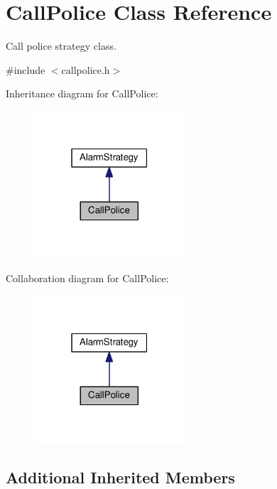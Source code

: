 \hypertarget{classCallPolice}{}\section{Call\+Police Class Reference}
\label{classCallPolice}


Call police strategy class.  




{\ttfamily \#include $<$callpolice.\+h$>$}



Inheritance diagram for Call\+Police\+:\nopagebreak
\begin{figure}[H]
\begin{center}
\leavevmode
\includegraphics[width=159pt]{classCallPolice__inherit__graph}
\end{center}
\end{figure}


Collaboration diagram for Call\+Police\+:\nopagebreak
\begin{figure}[H]
\begin{center}
\leavevmode
\includegraphics[width=159pt]{classCallPolice__coll__graph}
\end{center}
\end{figure}
\subsection*{Additional Inherited Members}


